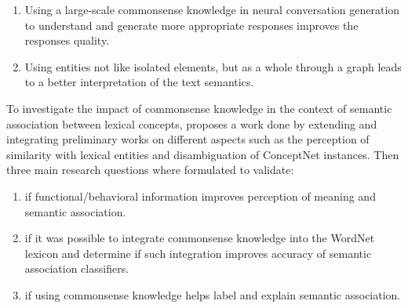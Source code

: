 \documentclass[runningheads]{llncs}
\begin{document}
\begin{enumerate}
	\item Using a large-scale commonsense knowledge in neural conversation generation to understand and generate more appropriate responses improves the responses quality.
	\item Using entities not like isolated elements, but as a whole through a graph leads to a better interpretation of the text semantics.
\end{enumerate}

To investigate the impact of commonsense knowledge in the context of semantic association between lexical concepts, \cite{Ruggeri2019} proposes a work done by extending and integrating preliminary works on different aspects such as the perception of similarity with lexical entities and disambiguation of ConceptNet \cite{Speer2016} instances. Then three main research questions where formulated to validate:

\begin{enumerate}
	\item if functional/behavioral information improves perception of meaning and semantic association.
	\item if it was possible to integrate commonsense knowledge into the WordNet lexicon and determine if such integration improves accuracy of semantic association classifiers.
	\item if using commonsense knowledge helps label and explain semantic association.
\end{enumerate}

%
%
%


%
\end{document}
